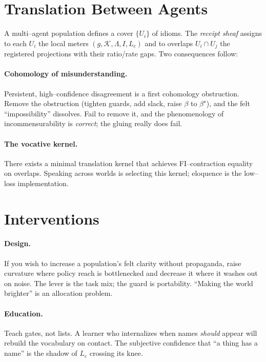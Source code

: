 \documentclass[11pt]{article}
\newcommand{\1}{\mathbf{1}}
\begin{document}
\section{Translation Between Agents}
\label{sec:translation}

A multi--agent population defines a cover $\{U_i\}$ of idioms. The \emph{receipt sheaf} assigns to each $U_i$ the local meters $(g,\mathcal{K}, \Lambda, I, L_c)$ and to overlaps $U_i\cap U_j$ the registered projections with their ratio/rate gaps. Two consequences follow:

\paragraph{Cohomology of misunderstanding.} Persistent, high--confidence disagreement is a first cohomology obstruction. Remove the obstruction (tighten guards, add slack, raise $\beta$ to $\beta^\star$), and the felt ``impossibility'' dissolves. Fail to remove it, and the phenomenology of incommensurability is \emph{correct}; the gluing really does fail.

\paragraph{The vocative kernel.} There exists a minimal translation kernel that achieves FI--contraction equality on overlaps. Speaking across worlds is selecting this kernel; eloquence is the low--loss implementation.

\section{Interventions}
\label{sec:interventions}

\paragraph{Design.} If you wish to increase a population's felt clarity without propaganda, raise curvature where policy reach is bottlenecked and decrease it where it washes out on noise. The lever is the task mix; the guard is portability. ``Making the world brighter'' is an allocation problem.

\paragraph{Education.} Teach gates, not lists. A learner who internalizes when names \emph{should} appear will rebuild the vocabulary on contact. The subjective confidence that ``a thing has a name'' is the shadow of $L_c$ crossing its knee.
\end{document}
